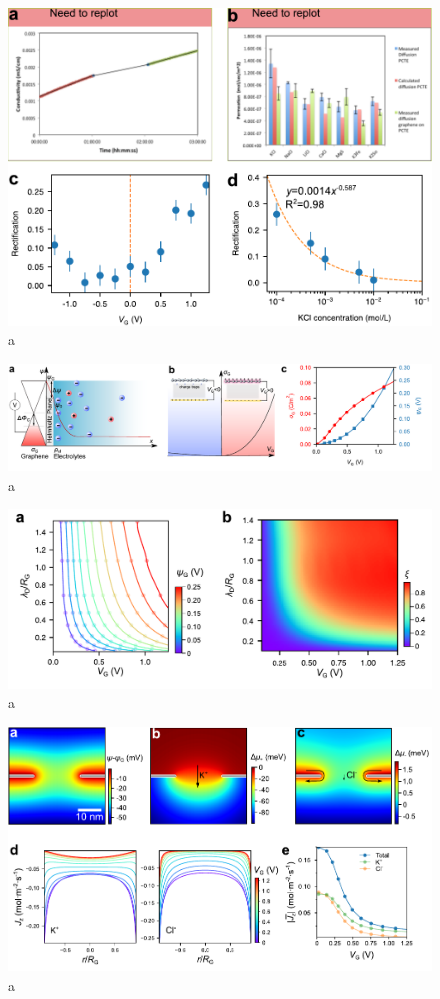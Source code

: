 \documentclass[manuscript=letter, email=true, hyperref=true, keywords=false]{achemso}
\begin{document}
\begin{figure}[htbp]
  \centering
  \includegraphics[width=0.85\linewidth]{img/fig2.pdf}
  \caption{a}
  \label{fig:2}
\end{figure}

\begin{figure}[htbp]
  \centering
  \includegraphics[width=0.95\linewidth]{img/fig3.pdf}
  \caption{a}
  \label{fig:3}
\end{figure}

\begin{figure}[htbp]
  \centering
  \includegraphics[width=0.85\linewidth]{img/fig4.pdf}
  \caption{a}
  \label{fig:4}
\end{figure}

\begin{figure}[htbp]
  \centering
  \includegraphics[width=0.9\linewidth]{img/fig5.pdf}
  \caption{a}
  \label{fig:5}
\end{figure}
\end{document}
